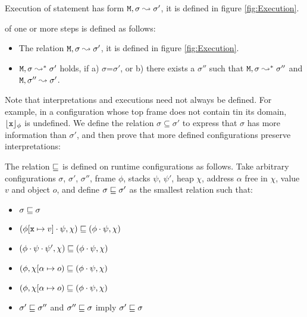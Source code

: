 Execution of statement has   form ${\mbox{\tt{\ensuremath{{\mbox{\tt{M}}}}}}}, \sigma \leadsto \sigma'$, it is defined in figure \ref{fig:Execution}.

\begin{definition}[Execution] of one or more steps is defined as follows:

\begin{itemize}
     \item 
   The relation ${\mbox{\tt{\ensuremath{{\mbox{\tt{M}}}}}}}, \sigma \leadsto \sigma'$, it is defined in figure \ref{fig:Execution}.
   \item
   ${\mbox{\tt{\ensuremath{{\mbox{\tt{M}}}}}}}, \sigma \leadsto^* \sigma'$ holds, if a) $\sigma$=$\sigma'$, or b) there exists a $\sigma''$ such that
   ${\mbox{\tt{\ensuremath{{\mbox{\tt{M}}}}}}}, \sigma \leadsto^* \sigma''$ and ${\mbox{\tt{\ensuremath{{\mbox{\tt{M}}}}}}}, \sigma'' \leadsto \sigma'$.
 \end{itemize}

\end{definition}

Note that interpretations and executions need not always be defined. For example, in a configuration whose top frame does not contain \x tin its domain, ${\lfloor{ {{\mbox{\tt{x}}}}}\rfloor_{\phi}} $ is undefined. We define the relation $\sigma \subseteq \sigma'$ to express that   $\sigma$ has more information than $\sigma'$, and then prove that more defined configurations preserve interpretations:

\begin{definition}
The relation $\sqsubseteq$   is defined on runtime configurations as follows. Take arbitrary 
configurations $\sigma$, $\sigma'$, $\sigma''$, frame $\phi$, stacks $\psi$, $\psi'$,  heap $\chi$, address $\alpha$ free in $\chi$, value $v$ and object $o$, and define $\sigma  \sqsubseteq \sigma'$ as the smallest relation such that:

\begin{itemize}
\item 
$\sigma  \sqsubseteq \sigma$
\item
$(\phi[{\mbox{\tt{x}}} \mapsto v]\cdot \psi, \chi) \sqsubseteq  (\phi\cdot \psi, \chi)$ 
\item
$(\phi\cdot\psi\cdot\psi', \chi) \sqsubseteq  (\phi\cdot \psi, \chi)$ 
\item
$(\phi, \chi[\alpha \mapsto o) \sqsubseteq  (\phi\cdot \psi, \chi)$ 
\item
$(\phi, \chi[\alpha \mapsto o) \sqsubseteq  (\phi\cdot \psi, \chi)$ 
\item
$\sigma'  \sqsubseteq \sigma''$ and $\sigma''  \sqsubseteq \sigma$ imply $\sigma'  \sqsubseteq \sigma$
\end{itemize}
\end{definition}


